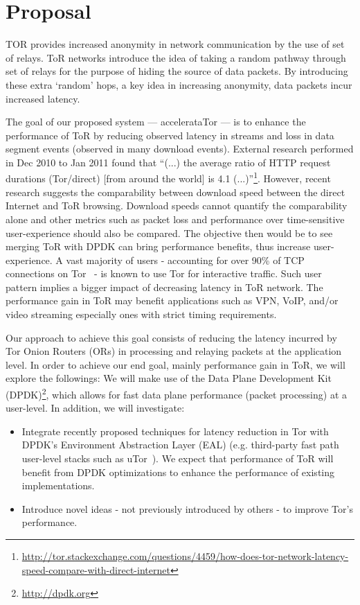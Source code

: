 \section{Proposal}
\label{sec:proposal}

TOR provides increased anonymity in network communication by the use of set of relays. ToR networks introduce the idea of taking a random pathway through set of relays for the purpose of hiding the source of data packets. By introducing these extra `random' hops, a key idea in increasing anonymity, data packets incur increased latency. 
 
The goal of our proposed system --- accelerataTor --- is to enhance the performance of ToR by reducing observed latency in streams and loss in data segment events (observed in many download events). External research performed in Dec 2010 to Jan 2011 found that ``(...) the average ratio of HTTP request durations (Tor/direct) [from around the world] is 4.1 (...)''\footnote{\label{note1}\url{http://tor.stackexchange.com/questions/4459/how-does-tor-network-latency-speed-compare-with-direct-internet}}. However, recent research suggests the comparability between download speed between the direct Internet and ToR browsing. Download speeds cannot quantify the comparability alone and other metrics such as packet loss and performance over time-sensitive user-experience should also be compared. The objective then would be to see merging ToR with DPDK can bring performance benefits, thus increase user-experience. A vast majority of users - accounting for over 90\% of TCP connections on Tor~\cite{Mccoy:2008:SLD:1428259.1428264} - is known to use Tor for interactive traffic. Such user pattern implies a bigger impact of decreasing latency in ToR network. The performance gain in ToR may benefit applications such as VPN, VoIP, and\slash or video streaming especially ones with strict timing requirements. 

Our approach to achieve this goal consists of reducing the latency incurred by Tor Onion Routers (ORs) in processing and relaying packets at the application level. In order to achieve our end goal, mainly performance gain in ToR, we will explore the followings:
We will make use of the Data Plane Development Kit (DPDK)\footnote{\url{http://dpdk.org}}, which allows for fast data plane performance (packet processing) at a user-level. In addition, we will investigate:

\begin{itemize}
	\item Integrate recently proposed techniques for latency reduction in Tor with DPDK’s Environment Abstraction Layer (EAL) (e.g. third-party fast path user-level stacks such as uTor~\cite{179191}). We expect that performance of ToR will benefit from DPDK optimizations to enhance the performance of existing implementations.
	\item Introduce novel ideas - not previously introduced by others - to improve Tor's performance.
\end{itemize}
